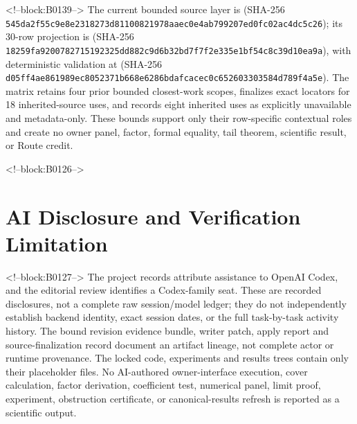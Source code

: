 \documentclass[11pt]{article}
\begin{document}
<!--block:B0139-->
The current bounded source layer is
 (SHA-256
\texttt{545da2f5\allowbreak{}5c9e8e23\allowbreak{}18273d81\allowbreak{}10082197\allowbreak{}8aaec0e4\allowbreak{}ab799207\allowbreak{}ed0fc02a\allowbreak{}c4dc5c26}); its 30-row projection is
 (SHA-256
\texttt{18259fa9\allowbreak{}20078271\allowbreak{}5192325d\allowbreak{}d882c9d6\allowbreak{}b32bd7f7\allowbreak{}f2e335e1\allowbreak{}bf54c8c3\allowbreak{}9d10ea9a}), with deterministic validation at
 (SHA-256
\texttt{d05ff4ae\allowbreak{}861989ec\allowbreak{}8052371b\allowbreak{}668e6286\allowbreak{}bdafcace\allowbreak{}c0c65260\allowbreak{}3303584d\allowbreak{}789f4a5e}).  The matrix retains four prior bounded
closest-work scopes, finalizes exact locators for 18 inherited-source uses, and
records eight inherited uses as explicitly unavailable and metadata-only. These
bounds support only their row-specific contextual roles and create no owner panel,
factor, formal equality, tail theorem, scientific result, or Route credit.
\par\endgroup

<!--block:B0126-->
\hypertarget{ai-disclosure-and-verification-limitation}{%
\section*{AI Disclosure and Verification
Limitation}\label{ai-disclosure-and-verification-limitation}}

<!--block:B0127-->
The project records attribute assistance to OpenAI Codex, and the editorial
review identifies a Codex-family seat. These are recorded disclosures, not a
complete raw session/model ledger; they do not independently establish backend
identity, exact session dates, or the full task-by-task activity history. The
bound revision evidence bundle, writer patch, apply report and source-finalization
record document an artifact lineage, not complete actor or runtime provenance.
The locked code, experiments and results trees contain only their placeholder
files. No AI-authored owner-interface execution, cover calculation, factor
derivation, coefficient test, numerical panel, limit proof, experiment, obstruction
certificate, or canonical-results refresh is reported as a scientific output.
\end{document}
